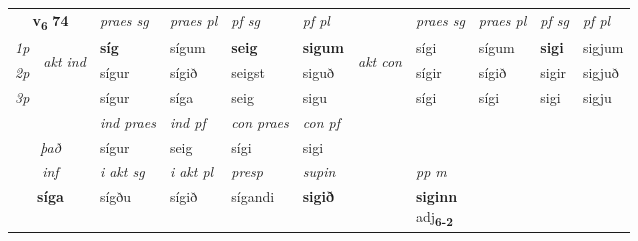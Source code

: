 \noindent
\begin{tabular}{lllllllllll} \toprule
\multicolumn{2}{c}{\textbf{v{\textsubscript{6}}} \Large{\textbf{74}}}  &  \textit{praes sg}  & \textit{praes pl}  &\textit{ pf sg} & \textit{pf pl} &  &  \textit{praes sg}  & \textit{praes pl}  & \textit{pf sg} & \textit{pf pl } \\*
	\cmidrule{3-6} \cmidrule{8-11}
 {\textit{1p}} & \multirow{3}{*}{\begin{turn}{90}\textit{akt ind}\end{turn}} & \textbf{síg} & sígum & \textbf{seig} & \textbf{sigum} & \multirow{3}{*}{\begin{turn}{90}\textit{akt con}\end{turn}} &sígi & sígum & \textbf{sigi} & sigjum\\*
 {\textit{2p}} &  &  sígur  & sígið & seigst & siguð & & sígir & sígið & sigir & sigjuð \\*
{\textit{3p}} &  & sígur & síga & seig & sigu & & sígi & sígi& sigi & sigju \\*
\cmidrule{3-6} \cmidrule{8-11}

   & &  \textit{ind praes} & \textit{ind pf} & \textit{con praes} & \textit{con pf} \\*
\multicolumn{2}{c}{ \textit{það} } & sígur & seig & sígi & sigi \\*

\cmidrule{3-8}
   \multicolumn{2}{c}{\textit{inf}}  & \textit{i akt sg} & \textit{i akt pl}   & \textit{presp} & \textit{supin}  && \textit{pp m} \\*
  \multicolumn{2}{c}{\textbf{síga}} & sígðu  & sígið   & sígandi &  \textbf{sigið}  && \specialcell{\textbf{siginn} \\ adj\textbf{\textsubscript{6-2}}} \\*
\end{tabular}

